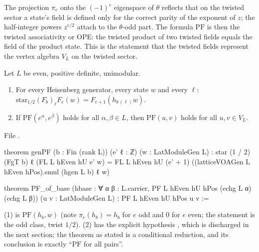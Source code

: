 \begin{physics}
The projection $\pi_e$ onto the $(-1)^e$ eigenspace of $\theta$ reflects that on the twisted sector a state's field is defined only for the correct parity of the exponent of $z$; the half-integer powers $z^{e/2}$ attach to the $\theta$-odd part. The formula $\mathrm{PF}$ is then the twisted associativity or OPE: the twisted product of two twisted fields equals the field of the product state. This is the statement that the twisted fields represent the vertex algebra $V_L$ on the twisted sector.
\end{physics}

\begin{theorem}\label{ch08:thm:PFred}
Let $L$ be even, positive definite, unimodular.
\begin{enumerate}
\item For every Heisenberg generator, every state $w$ and every $\ell$:
  $\mathrm{star}_{1/2}(F_b)_\ell F_e(w)=F_{e+1}(h_{b\,(\ell)}w)$.
\item If $\mathrm{PF}(e^\alpha,e^\beta)$ holds for all $\alpha,\beta\in L$, then $\mathrm{PF}(u,v)$
  holds for all $u,v\in V_L$.
\end{enumerate}
\end{theorem}
\noindent File .
\begin{leancode}
theorem genPF (b : Fin (rank L)) (e' ℓ : ℤ) (w : LatModuleGen L) :
    star (1 / 2) (FgT b) ℓ (FL L hEven hU e' w)
      = FL L hEven hU (e' + 1) ((latticeVOAGen L hEven hPos).smul (hgen L b) ℓ w)

theorem PF_of_base (hbase : ∀ α β : L.carrier, PF L hEven hU hPos (echg L α) (echg L β))
    (u v : LatModuleGen L) : PF L hEven hU hPos u v :=
\end{leancode}
\begin{dictionary}
(1) is $\mathrm{PF}(h_b,w)$ (note $\pi_e(h_b)=h_b$ for $e$ odd and $0$ for $e$ even; the
statement is the odd class, twist $1/2$).  (2) has the explicit hypothesis , which is
discharged in the next section; the theorem as stated is a conditional reduction, and its
conclusion is exactly ``$\mathrm{PF}$ for all pairs''.
\end{dictionary}

